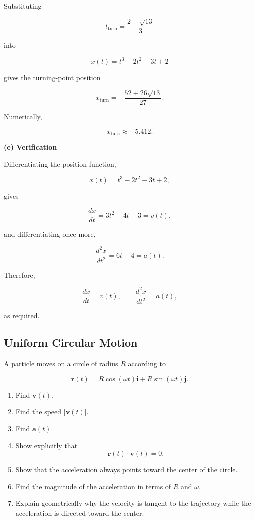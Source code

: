 \documentclass[../main.tex]{subfiles}
\theoremstyle{remark}
\begin{document}
Substituting

\[
t_{\mathrm{turn}}
=
\frac{2+\sqrt{13}}{3}
\]

into

\[
x(t)=t^3-2t^2-3t+2
\]

gives the turning-point position

\[
\boxed{
x_{\mathrm{turn}}
=
-\frac{52+26\sqrt{13}}{27}.
}
\]

Numerically,

\[
x_{\mathrm{turn}}\approx -5.412.
\]

\textbf{(e) Verification}

Differentiating the position function,

\[
x(t)=t^3-2t^2-3t+2,
\]

gives

\[
\frac{dx}{dt}
=
3t^2-4t-3
=
v(t),
\]

and differentiating once more,

\[
\frac{d^2x}{dt^2}
=
6t-4
=
a(t).
\]

Therefore,

\[
\boxed{
\frac{dx}{dt}=v(t),
\qquad
\frac{d^2x}{dt^2}=a(t),
}
\]

as required.


\subsection{Uniform Circular Motion}

A particle moves on a circle of radius \(R\) according to

\[
\mathbf{r}(t)
=
R\cos(\omega t)\mathbf{i}
+
R\sin(\omega t)\mathbf{j}.
\]

\begin{enumerate}
    \item Find \(\mathbf{v}(t)\).
    \item Find the speed \( |\mathbf{v}(t)|\).
    \item Find \(\mathbf{a}(t)\).
    \item Show explicitly that
    \[
    \mathbf{r}(t)\cdot\mathbf{v}(t)=0.
    \]
    \item Show that the acceleration always points toward the center of the circle.
    \item Find the magnitude of the acceleration in terms of \(R\) and \(\omega\).
    \item Explain geometrically why the velocity is tangent to the trajectory while the acceleration is directed toward the center.
\end{enumerate}
\end{document}
